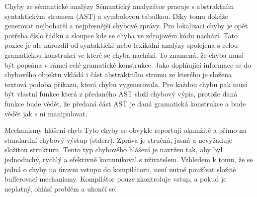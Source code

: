 \secc Chyby ze sémantické analýzy
Sémantický analyzátor pracuje s abstraktním syntaktickým stromem (AST) a symbolovou tabulkou. Díky tomu dokáže generovat nejbohatší a nejpřesnější chybové zprávy. Pro lokalizaci chyby je opět potřeba číslo řádku a sloupce kde se chyba ve zdrojovém kódu nachází. Tato pozice je ale narozdíl od syntaktické nebo lexikální analýzy spolejena s celou gramatickou konstrukcí ve které se chyba nachází. To znamená, že chyba musí být popsána v rámci celé gramatické konstrukce. Jako doplňující informace se do chybového objektu vkládá i část abstraktního stromu ze kterého je složena textová podoba příkazu, která chybu vygenerovala. Pro každou chybu pak musí být vlastní funkce která z předaného AST složí chybový výpis, protože daná funkce bude vědět, že předaná část AST je daná gramatická konstrukce a bude vědět jak s ní manipulovat.

\secc Mechanismy hlášení chyb
Tyto chyby se obvykle reportují okamžitě a přímo na standardní chybový výstup (stderr). Zpráva je stručná, jasná a nevyžaduje složitou strukturu. Tento typ chybového hlášení je navržen tak, aby byl jednoduchý, rychlý a efektivně komunikoval s uživatelem. Vzhledem k tomu, že se jedná o chyby na úrovni vstupu do kompilátoru, není nutné používat složité bufferovací mechanismy. Kompilátor pouze zkontroluje vstup, a pokud je neplatný, ohlásí problém a ukončí se.
